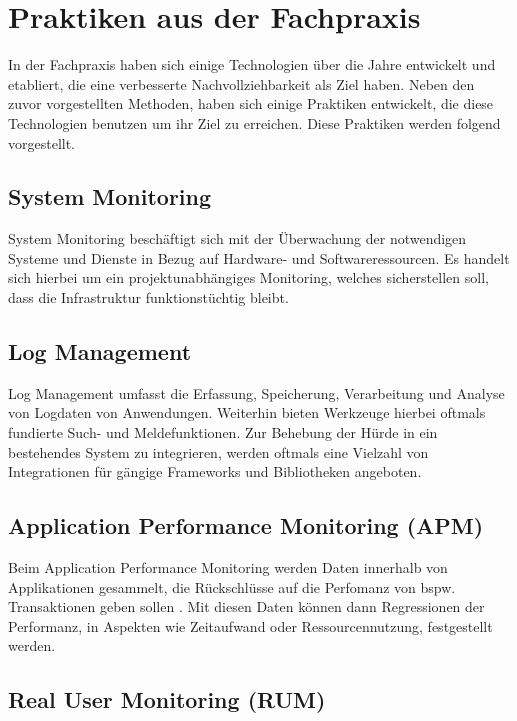 \section{Praktiken aus der Fachpraxis}

In der Fachpraxis haben sich einige Technologien über die Jahre entwickelt und etabliert, die eine verbesserte Nachvollziehbarkeit als Ziel haben. Neben den zuvor vorgestellten Methoden, haben sich einige Praktiken entwickelt, die diese Technologien benutzen um ihr Ziel zu erreichen. Diese Praktiken werden folgend vorgestellt.

\subsection{System Monitoring}

System Monitoring beschäftigt sich mit der Überwachung der notwendigen Systeme und Dienste in Bezug auf Hardware- und Softwareressourcen. Es handelt sich hierbei um ein projektunabhängiges Monitoring, welches sicherstellen soll, dass die Infrastruktur funktionstüchtig bleibt.

\subsection{Log Management}

Log Management umfasst die Erfassung, Speicherung, Verarbeitung und Analyse von Logdaten von Anwendungen. Weiterhin bieten Werkzeuge hierbei oftmals fundierte Such- und Meldefunktionen. Zur Behebung der Hürde in ein bestehendes System zu integrieren, werden oftmals eine Vielzahl von Integrationen für gängige Frameworks und Bibliotheken angeboten.

\subsection{Application Performance Monitoring (APM)}

Beim Application Performance Monitoring werden Daten innerhalb von Applikationen gesammelt, die Rückschlüsse auf die Perfomanz von bspw. Transaktionen geben sollen \cite{StudyingTheEffectivenessOfAPMTools}. Mit diesen Daten können dann Regressionen der Performanz, in Aspekten wie Zeitaufwand oder Ressourcennutzung, festgestellt werden.

\subsection{Real User Monitoring (RUM)}

